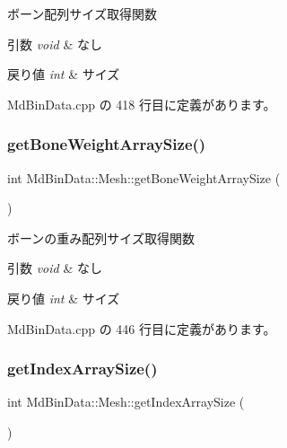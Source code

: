 ボーン配列サイズ取得関数 


\begin{DoxyParams}{引数}
{\em void} & なし \\
\hline
\end{DoxyParams}

\begin{DoxyRetVals}{戻り値}
{\em int} & サイズ \\
\hline
\end{DoxyRetVals}


 Md\+Bin\+Data.\+cpp の 418 行目に定義があります。

\mbox{\label{class_md_bin_data_1_1_mesh_a1ba626e81e0b44f7bd7f2963129655ec}} 
\subsubsection{\texorpdfstring{get\+Bone\+Weight\+Array\+Size()}{getBoneWeightArraySize()}}
{\footnotesize\ttfamily int Md\+Bin\+Data\+::\+Mesh\+::get\+Bone\+Weight\+Array\+Size (\begin{DoxyParamCaption}{ }\end{DoxyParamCaption})}



ボーンの重み配列サイズ取得関数 


\begin{DoxyParams}{引数}
{\em void} & なし \\
\hline
\end{DoxyParams}

\begin{DoxyRetVals}{戻り値}
{\em int} & サイズ \\
\hline
\end{DoxyRetVals}


 Md\+Bin\+Data.\+cpp の 446 行目に定義があります。

\mbox{\label{class_md_bin_data_1_1_mesh_ae8e5e348db511c353ffd8aaa89c906b3}} 
\subsubsection{\texorpdfstring{get\+Index\+Array\+Size()}{getIndexArraySize()}}
{\footnotesize\ttfamily int Md\+Bin\+Data\+::\+Mesh\+::get\+Index\+Array\+Size (\begin{DoxyParamCaption}{ }\end{DoxyParamCaption})}



